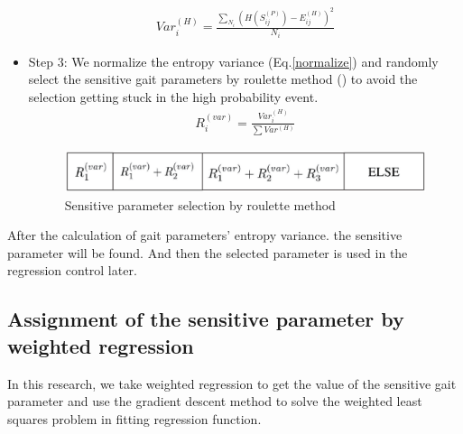 \begin{itemize}
	\begin{eqnarray}\label{var_entropy}
	Var_{i}^{(H)}=\frac{\sum _{N_{i}}(H(S_{ij}^{(P)})-E_{ij}^{(H)})^{2}}{N_{i}}
	\end{eqnarray}
	
	\item Step 3: We normalize the entropy variance (Eq.\ref{normalize}) and randomly select the sensitive gait parameters by roulette method () to avoid the selection getting stuck in the high probability event.
	\begin{eqnarray}\label{normalize}
	R_{i}^{(var)}=\frac{Var_{i}^{(H)}}{\sum Var^{(H)}}
	\end{eqnarray}
	
	\begin{figure}[H]
		\centering
		\includegraphics[width=\linewidth]{fig/mainwork/Roulette}
		\caption{Sensitive parameter selection by roulette method}
	\end{figure}
\end{itemize}

After the calculation of gait parameters' entropy variance. the sensitive parameter will be found. And then the selected parameter is used in the regression control later.


\subsection{Assignment of the sensitive parameter by weighted regression}

In this research, we take weighted regression to get the value of the sensitive gait parameter and use the gradient descent method to solve the weighted least squares problem in fitting regression function.

